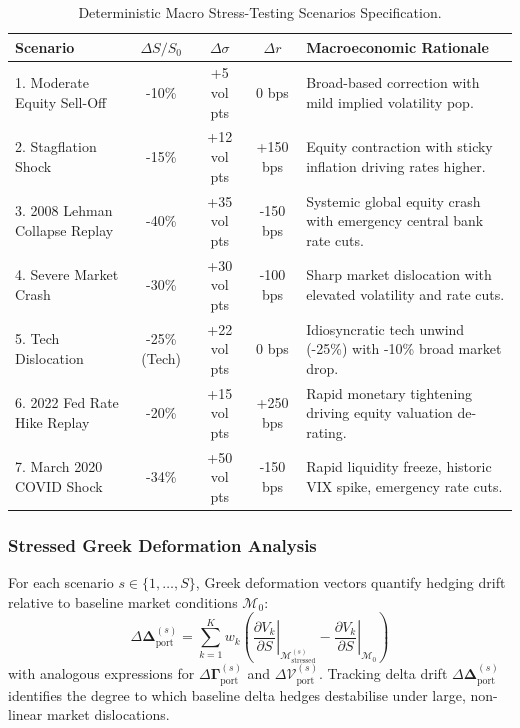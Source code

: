 \documentclass{article}
\theoremstyle{plain}
\theoremstyle{definition}
\theoremstyle{remark}
\begin{document}
\begin{table}[htbp]
\centering
\small
\caption{Deterministic Macro Stress-Testing Scenarios Specification.}
\label{tab:stress_scenarios_spec}
\begin{tabularx}{\textwidth}{l c c c X}
\toprule
\textbf{Scenario} & $\Delta S / S_0$ & $\Delta \sigma$ & $\Delta r$ & \textbf{Macroeconomic Rationale} \\
\midrule
1. Moderate Equity Sell-Off & -10\% & +5 vol pts & 0 bps & Broad-based correction with mild implied volatility pop. \\
2. Stagflation Shock & -15\% & +12 vol pts & +150 bps & Equity contraction with sticky inflation driving rates higher. \\
3. 2008 Lehman Collapse Replay & -40\% & +35 vol pts & -150 bps & Systemic global equity crash with emergency central bank rate cuts. \\
4. Severe Market Crash & -30\% & +30 vol pts & -100 bps & Sharp market dislocation with elevated volatility and rate cuts. \\
5. Tech Dislocation & -25\% (Tech) & +22 vol pts & 0 bps & Idiosyncratic tech unwind (-25\%) with -10\% broad market drop. \\
6. 2022 Fed Rate Hike Replay & -20\% & +15 vol pts & +250 bps & Rapid monetary tightening driving equity valuation de-rating. \\
7. March 2020 COVID Shock & -34\% & +50 vol pts & -150 bps & Rapid liquidity freeze, historic VIX spike, emergency rate cuts. \\
\bottomrule
\end{tabularx}
\end{table}

\subsubsection{Stressed Greek Deformation Analysis}
For each scenario $s \in \{1, \dots, S\}$, Greek deformation vectors quantify hedging drift relative to baseline market conditions $\mathcal{M}_0$:
\begin{equation}
    \Delta \boldsymbol{\Delta}_{\text{port}}^{(s)} = \sum_{k=1}^K w_k \left( \left.\frac{\partial V_k}{\partial S}\right|_{\mathcal{M}_{\text{stressed}}^{(s)}} - \left.\frac{\partial V_k}{\partial S}\right|_{\mathcal{M}_0} \right)
\end{equation}
with analogous expressions for $\Delta \mathbf{\Gamma}_{\text{port}}^{(s)}$ and $\Delta \boldsymbol{\mathcal{V}}_{\text{port}}^{(s)}$. Tracking delta drift $\Delta \boldsymbol{\Delta}_{\text{port}}^{(s)}$ identifies the degree to which baseline delta hedges destabilise under large, non-linear market dislocations.
\end{document}
